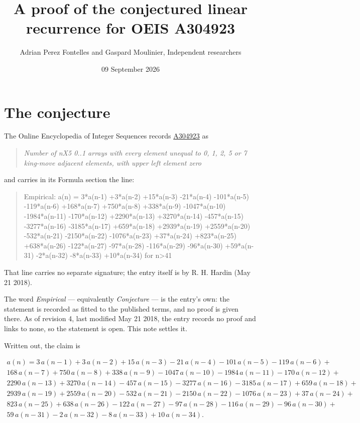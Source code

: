 \documentclass[11pt]{article}
\title{A proof of the conjectured linear recurrence for OEIS A304923}
\author{Adrian Perez Fontelles and Gaspard Moulinier, Independent researchers}
\date{09 September 2026}
\theoremstyle{definition}
\begin{document}
\maketitle
\section{The conjecture}

The Online Encyclopedia of Integer Sequences records \href{https://oeis.org/A304923}{A304923} as

\begin{quote}\itshape Number of nX5 0..1 arrays with every element unequal to 0, 1, 2, 5 or 7 king-move adjacent elements, with upper left element zero\end{quote}

and carries in its Formula section the line:

\begin{quote}\ttfamily Empirical: a(n) = 3*a(n-1) +3*a(n-2) +15*a(n-3) -21*a(n-4) -101*a(n-5) -119*a(n-6) +168*a(n-7) +750*a(n-8) +338*a(n-9) -1047*a(n-10) -1984*a(n-11) -170*a(n-12) +2290*a(n-13) +3270*a(n-14) -457*a(n-15) -3277*a(n-16) -3185*a(n-17) +659*a(n-18) +2939*a(n-19) +2559*a(n-20) -532*a(n-21) -2150*a(n-22) -1076*a(n-23) +37*a(n-24) +823*a(n-25) +638*a(n-26) -122*a(n-27) -97*a(n-28) -116*a(n-29) -96*a(n-30) +59*a(n-31) -2*a(n-32) -8*a(n-33) +10*a(n-34) for n>41\end{quote}

That line carries no separate signature; the entry itself is by R. H. Hardin (May 21 2018).

The word {\itshape Empirical} --- equivalently {\itshape Conjecture} --- is the entry's own: the statement is recorded as fitted to the published terms, and no proof is given there. As of revision 4, last modified May 21 2018, the entry records no proof and links to none, so the statement is open. This note settles it.

Written out, the claim is

\begin{multline*} a(n) = 3\,a(n-1) + 3\,a(n-2) + 15\,a(n-3) - 21\,a(n-4) - 101\,a(n-5) - 119\,a(n-6) + \\ 168\,a(n-7) + 750\,a(n-8) + 338\,a(n-9) - 1047\,a(n-10) - 1984\,a(n-11) - 170\,a(n-12) + \\ 2290\,a(n-13) + 3270\,a(n-14) - 457\,a(n-15) - 3277\,a(n-16) - 3185\,a(n-17) + 659\,a(n-18) + \\ 2939\,a(n-19) + 2559\,a(n-20) - 532\,a(n-21) - 2150\,a(n-22) - 1076\,a(n-23) + 37\,a(n-24) + \\ 823\,a(n-25) + 638\,a(n-26) - 122\,a(n-27) - 97\,a(n-28) - 116\,a(n-29) - 96\,a(n-30) + \\ 59\,a(n-31) - 2\,a(n-32) - 8\,a(n-33) + 10\,a(n-34). \end{multline*}
\end{document}
